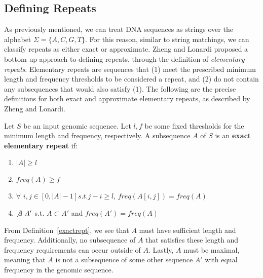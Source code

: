 \subsection{Defining Repeats}
As previously mentioned, we can treat DNA sequences as strings over the alphabet $\Sigma=\lbrace A, C, G, T \rbrace$. For this reason, similar to string matchings, we can classify repeats as either exact or approximate. Zheng and Lonardi \cite{zheng2005discovery} proposed a bottom-up approach to defining repeats, through the definition of \textit{elementary repeats}. Elementary repeats are sequences that (1) meet the prescribed minimum length and frequency thresholds to be considered a repeat, and (2) do not contain any subsequences that would also satisfy (1). The following are the precise definitions for both exact and approximate elementary repeats, as described by Zheng and Lonardi.

\begin{defn}
Let $S$ be an input genomic sequence. Let $l, f$ be some fixed thresholds for the minimum length and frequency, respectively.  A subsequence $A$ of $S$ is an \textbf{exact elementary repeat} if:
\begin{enumerate}
\item{$|A| \geq l$}
\item{$freq(A) \geq f$}
\item{$\forall$ $i, j \in [0,|A|-1] s.t. j-i \geq l$,  $freq(A[i,j]) = freq(A)$}
\item{$\not\exists\ A'$ s.t. $A \subset A'$ and $freq(A') = freq(A)$}
\end{enumerate}
\label{exactrept}
\end{defn}

From Definition~\ref{exactrept}, we see that $A$ must have sufficient length and frequency. Additionally, no subsequence of $A$ that satisfies these length and frequency requirements can occur outside of $A$. Lastly, $A$ must be maximal, meaning that $A$ is not a subsequence of some other sequence $A'$ with equal frequency in the genomic sequence.

